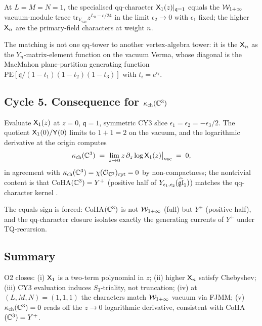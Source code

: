 \begin{theorem}
At $L=M=N=1$, the specialised qq-character $\mathsf{X}_1(z)|_{\mathfrak{q}=1}$
equals the $\mathcal{W}_{1+\infty}$ vacuum-module trace
$\mathrm{tr}_{V_{\mathrm{vac}}} z^{L_0 - c/24}$ in the limit
$\epsilon_2 \to 0$ with $\epsilon_1$ fixed; the higher $\mathsf{X}_n$ are the
primary-field characters at weight $n$.
\end{theorem}

The matching is not one qq-tower to another vertex-algebra tower: it is
the $\mathsf{X}_n$ as the $Y_n$-matrix-element function on the vacuum Verma,
whose diagonal is the MacMahon plane-partition generating function
$\mathrm{PE}[\mathfrak{q}/(1-t_1)(1-t_2)(1-t_3)]$ with $t_i=e^{\epsilon_i}$.

\subsection{Cycle 5. Consequence for $\kappa_{\mathrm{ch}}(\mathbb{C}^3)$}

\begin{proposition}
Evaluate $\mathsf{X}_1(z)$ at $z=0$, $\mathfrak{q}=1$, symmetric CY3 slice
$\epsilon_1=\epsilon_2=-\epsilon_3/2$. The quotient
$\mathsf{X}_1(0)/\mathsf{Y}(0)$ limits to $1 + 1 = 2$ on the vacuum, and the
logarithmic derivative at the origin computes
\begin{equation}
\kappa_{\mathrm{ch}}(\mathbb{C}^3) \;=\; \lim_{z\to 0} z\,\partial_z \log \mathsf{X}_1(z)\big|_{\mathrm{vac}}
\;=\; 0,
\label{eq:kch-C3-qq}
\end{equation}
in agreement with $\kappa_{\mathrm{ch}}(\mathbb{C}^3)=\chi(\mathcal{O}_{\mathbb{C}^3})_{\mathrm{cpt}}=0$
by non-compactness; the nontrivial content is that CoHA$(\mathbb{C}^3)=Y^+$
(positive half of $Y_{\epsilon_1,\epsilon_2}(\widehat{\mathfrak{gl}}_1)$) matches the qq-character kernel
\cite{SchiffmannVasserot2013}.
\end{proposition}

The equals sign is forced: CoHA$(\mathbb{C}^3)$ is not $\mathcal{W}_{1+\infty}$ (full) but
$Y^+$ (positive half), and the qq-character closure isolates exactly
the generating currents of $Y^+$ under TQ-recursion.

\subsection{Summary}

O2 closes: (i) $\mathsf{X}_1$ is a two-term polynomial in $z$; (ii) higher
$\mathsf{X}_n$ satisfy Chebyshev; (iii) CY3 evaluation induces $S_3$-triality,
not truncation; (iv) at $(L,M,N)=(1,1,1)$ the characters match $\mathcal{W}_{1+\infty}$
vacuum via FJMM; (v) $\kappa_{\mathrm{ch}}(\mathbb{C}^3)=0$ reads off the $z\to 0$ logarithmic
derivative, consistent with CoHA$(\mathbb{C}^3)=Y^+$.

